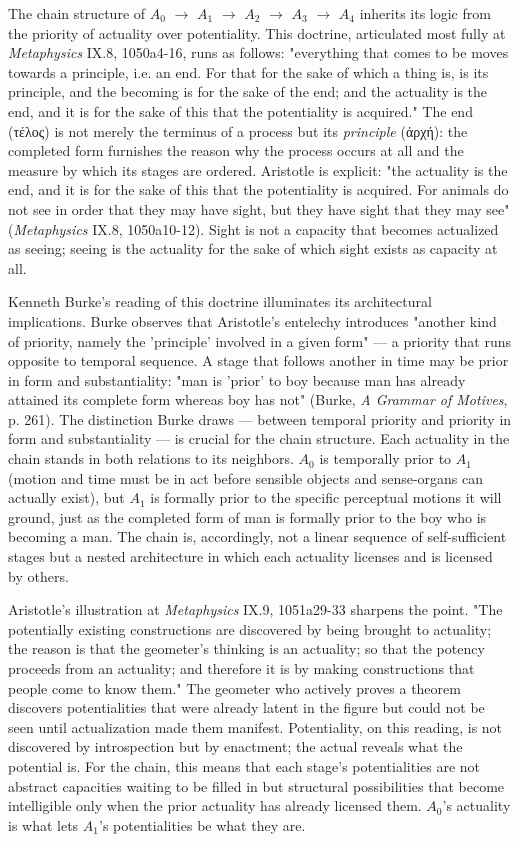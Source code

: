 \documentclass[12pt]{article}
\newcommand{\gk}[1]{{\greekfont #1}}%
\newcommand{\gk}[1]{{\greekfont #1}}%
\newcommand{\gk}[1]{#1}%
\begin{document}
The chain structure of $A_0$ $\to$ $A_1$ $\to$ $A_2$ $\to$ $A_3$ $\to$ $A_4$ inherits its logic from the priority of actuality over potentiality. This doctrine, articulated most fully at \textit{Metaphysics} IX.8, 1050a4-16, runs as follows: "everything that comes to be moves towards a principle, i.e. an end. For that for the sake of which a thing is, is its principle, and the becoming is for the sake of the end; and the actuality is the end, and it is for the sake of this that the potentiality is acquired." The end (\gk{τέλος}) is not merely the terminus of a process but its \textit{principle} (\gk{ἀρχή}): the completed form furnishes the reason why the process occurs at all and the measure by which its stages are ordered. Aristotle is explicit: "the actuality is the end, and it is for the sake of this that the potentiality is acquired. For animals do not see in order that they may have sight, but they have sight that they may see" (\textit{Metaphysics} IX.8, 1050a10-12). Sight is not a capacity that becomes actualized as seeing; seeing is the actuality for the sake of which sight exists as capacity at all.

Kenneth Burke's reading of this doctrine illuminates its architectural implications. Burke observes that Aristotle's entelechy introduces "another kind of priority, namely the 'principle' involved in a given form" --- a priority that runs opposite to temporal sequence. A stage that follows another in time may be prior in form and substantiality: "man is 'prior' to boy because man has already attained its complete form whereas boy has not" (Burke, \textit{A Grammar of Motives}, p. 261). The distinction Burke draws --- between temporal priority and priority in form and substantiality --- is crucial for the chain structure. Each actuality in the chain stands in both relations to its neighbors. $A_0$ is temporally prior to $A_1$ (motion and time must be in act before sensible objects and sense-organs can actually exist), but $A_1$ is formally prior to the specific perceptual motions it will ground, just as the completed form of man is formally prior to the boy who is becoming a man. The chain is, accordingly, not a linear sequence of self-sufficient stages but a nested architecture in which each actuality licenses and is licensed by others.

Aristotle's illustration at \textit{Metaphysics} IX.9, 1051a29-33 sharpens the point. "The potentially existing constructions are discovered by being brought to actuality; the reason is that the geometer's thinking is an actuality; so that the potency proceeds from an actuality; and therefore it is by making constructions that people come to know them." The geometer who actively proves a theorem discovers potentialities that were already latent in the figure but could not be seen until actualization made them manifest. Potentiality, on this reading, is not discovered by introspection but by enactment; the actual reveals what the potential is. For the chain, this means that each stage's potentialities are not abstract capacities waiting to be filled in but structural possibilities that become intelligible only when the prior actuality has already licensed them. $A_0$'s actuality is what lets $A_1$'s potentialities be what they are.
\end{document}
